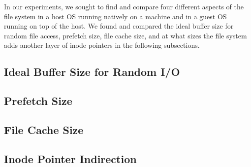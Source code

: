 In our experiments, we sought to find and compare four different aspects of the 
file system in a host OS running natively on a machine and in a guest OS running
on top of the host. We found and compared the ideal buffer size for random file 
access, prefetch size, file cache size, and at what sizes the file system adds 
another layer of inode pointers in the following subsections.

\subsection{Ideal Buffer Size for Random I/O}
\label{sec:p1}


\subsection{Prefetch Size}
\label{sec:p2}


\subsection{File Cache Size}
\label{sec:p3}


\subsection{Inode Pointer Indirection}
\label{sec:p4}


